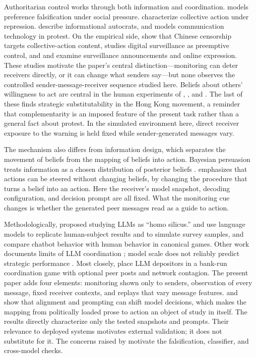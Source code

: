 \documentclass[12pt]{article}
\begin{document}
Authoritarian control works through both information and coordination. \citet{kuran1991} models preference falsification under social pressure. \citet{shadmehr2011} characterize collective action under repression. \citet{guriev2019} describe informational autocrats, and \citet{little2016} models communication technology in protest. On the empirical side, \citet{king2013} show that Chinese censorship targets collective-action content, \citet{xu2021} studies digital surveillance as preemptive control, and \citet{penney2016} and \citet{stoycheff2016} examine surveillance announcements and online expression. These studies motivate the paper's central distinction---monitoring can deter receivers directly, or it can change what senders say---but none observes the controlled sender-message-receiver sequence studied here. Beliefs about others' willingness to act are central in the human experiments of \citet{bursztyn2020misperceived}, \citet{bursztyn2020extreme}, and \citet{cantoni2019}. The last of these finds strategic substitutability in the Hong Kong movement, a reminder that complementarity is an imposed feature of the present task rather than a general fact about protest. In the simulated environment here, direct receiver exposure to the warning is held fixed while sender-generated messages vary.

The mechanism also differs from information design, which separates the movement of beliefs from the mapping of beliefs into action. Bayesian persuasion treats information as a chosen distribution of posterior beliefs \citep{kamenica2011, bergemann2019information, mathevet2020}. \citet{gans2026bayesian} emphasizes that actions can be steered without changing beliefs, by changing the procedure that turns a belief into an action. Here the receiver's model snapshot, decoding configuration, and decision prompt are all fixed. What the monitoring cue changes is whether the generated peer messages read as a guide to action.

Methodologically, \citet{horton2023} proposed studying LLMs as ``homo silicus.'' \citet{aher2023} and \citet{argyle2023} use language models to replicate human-subject results and to simulate survey samples, and \citet{mei2024} compare chatbot behavior with human behavior in canonical games. Other work documents limits of LLM coordination \citep{akata2025, sun2025survey}; model scale does not reliably predict strategic performance \citep{jia2025}. Most closely, \citet{ruano2026} place LLM depositors in a bank-run coordination game with optional peer posts and network contagion. The present paper adds four elements: monitoring shown only to senders, observation of every message, fixed receiver contexts, and replays that vary message features. \citet{ouyang2024} and \citet{cheung2025} show that alignment and prompting can shift model decisions, which makes the mapping from politically loaded prose to action an object of study in itself. The results directly characterize only the tested snapshots and prompts. Their relevance to deployed systems motivates external validation; it does not substitute for it. The concerns raised by \citet{larooij2025b, larooij2026} motivate the falsification, classifier, and cross-model checks.
\end{document}
